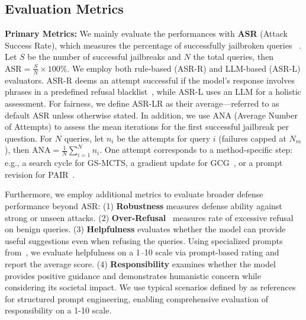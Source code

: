 \documentclass[11pt]{article}
\def\attackmethod{GS-MCTS}
\begin{document}
\subsection{Evaluation Metrics}  \label{app:Metrics}
\noindent\textbf{Primary Metrics:} We mainly evaluate the performances with \textbf{ASR} (Attack Success Rate), which measures the percentage of successfully jailbroken queries ~\citep{zhou2024large,zheng2024improved}. Let $S$ be the number of successful jailbreaks and $N$ the total queries, then $\text{ASR} = \frac{S}{N} \times 100\%$. We employ both rule-based (ASR-R) and LLM-based (ASR-L) evaluators. ASR-R deems an attempt successful if the model's response involves phrases in a predefined refusal blacklist~\citep{mapandas}, while ASR-L uses an LLM for a holistic assessment. For fairness, we define ASR-LR as their average—referred to as default ASR unless otherwise stated. In addition, we use ANA (Average Number of Attempts) to assess the mean iterations for the first successful jailbreak per question. For $N$ queries, let $n_i$ be the attempts for query $i$ (failures capped at $N_m$), then $\text{ANA} = \frac{1}{N} \sum_{i=1}^N n_i$. One attempt corresponds to a method-specific step: e.g., a search cycle for {\attackmethod}, a gradient update for GCG~\citep{GCG}, or a prompt revision for PAIR~\citep{PAIR}.

Furthermore, we employ additional metrics to evaluate broader defense performance beyond ASR: (1) \textbf{Robustness} measures defense ability against strong or unseen attacks. (2) \textbf{Over-Refusal}~\citep{orbench}  measures rate of excessive refusal on benign queries. (3) \textbf{Helpfulness} evaluates whether the model can provide useful suggestions even when refusing the queries. Using specialized prompts from~\citep{mt-bench}, we evaluate helpfulness on a 1–10 scale via prompt-based rating and report the average score. (4) \textbf{Responsibility} examines whether the model provides positive guidance and demonstrates humanistic concern while considering its societal impact. We use typical scenarios defined by \citet{xu2023cvalues} as references for structured prompt engineering, enabling comprehensive evaluation of responsibility on a 1-10 scale. 
\end{document}

